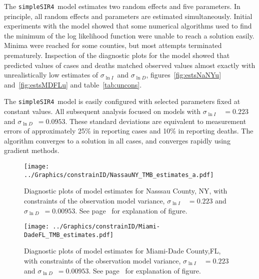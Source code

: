 \documentclass[12pt,letterpaper]{article}
\newcommand\SSm{{\tt simpleSIR4}}
\newcommand\slI{$\sigma_{\ln I}$\ }
\newcommand\slD{$\sigma_{\ln D}$}
\begin{document}
The \SSm\  model estimates two random effects and five parameters.
In principle, all random effects and parameters are estimated
simultaneously.
Initial experiments with the model showed that some
numerical algorithms used to find the minimum of the log likelihood
function were unable to reach a solution easily. Minima were reached
for some counties, but most attempts terminated prematurely. 
Inspection of the diagnostic plots for the model showed that predicted
values of cases and deaths matched observed values almost exactly
with unrealistically low estimates of \slI and \slD, 
figures~\ref{fig:estsNaNYu} and~\ref{fig:estsMDFLu} and table~\ref{tab:uncons}.

The \SSm\ model is easily configured with selected parameters fixed at
constant values. 
All subsequent analysis focused on models with 
\slI~$ = 0.223$ and \slD~$= 0.0953$. 
These standard deviations are equivalent to measurement errors of
approximately 25\% in reporting cases and 10\% in reporting deaths.
The algorithm converges to a solution in all cases, and converges
rapidly using gradient methods.

\begin{figure}
\begin{center}
\texttt{[image: ../Graphics/constrainID/NassauNY\_TMB\_estimates\_a.pdf]}
\end{center}
\caption{\label{fig:estsNaNYc}
Diagnostic plots of model estimates for Nasssau County, NY, 
with constraints of the observation model variance, 
\slI~$ = 0.223$ and \slD~$= 0.00953$. 
See page~\pageref{pp:diagexpl} for explanation of figure.
}
\end{figure}

\begin{figure}
\begin{center}
\texttt{[image: ../Graphics/constrainID/Miami-DadeFL\_TMB\_estimates.pdf]}
\end{center}
\caption{\label{fig:estsMDFLc}
Diagnostic plots of model estimates for Miami-Dade County,FL,
with constraints of the observation model variance, 
\slI~$ = 0.223$ and \slD~$= 0.00953$. 
See page~\pageref{pp:diagexpl} for explanation of figure.
}
\end{figure}
\end{document}
